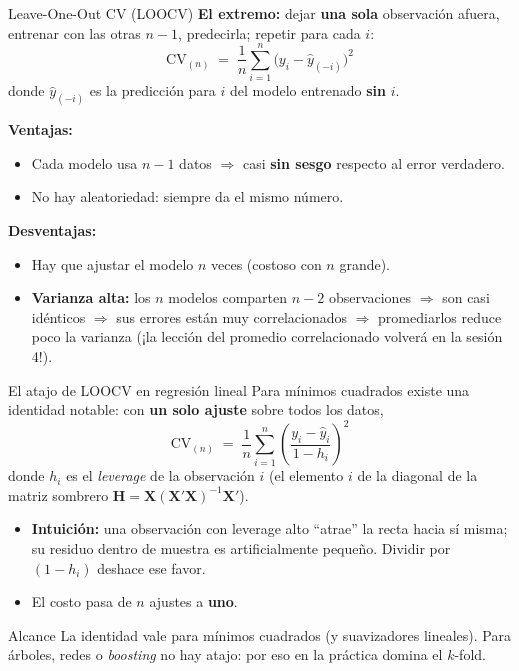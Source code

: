 \documentclass{beamer}
\newcommand{\1}{\mathbb{I}}
\begin{document}
\begin{frame}{Leave-One-Out CV (LOOCV)}
\small
\textbf{El extremo:} dejar \textbf{una sola} observación afuera, entrenar con las otras $n-1$, predecirla; repetir para cada $i$:
\[ \mathrm{CV}_{(n)} \;=\; \frac{1}{n} \sum_{i=1}^{n} \big( y_i - \hat{y}_{(-i)} \big)^2 \]
donde $\hat{y}_{(-i)}$ es la predicción para $i$ del modelo entrenado \textbf{sin} $i$.
\pause

\vspace{0.2cm}
\textbf{Ventajas:}
\begin{itemize}\itemsep3pt
  \item Cada modelo usa $n-1$ datos $\Rightarrow$ casi \textbf{sin sesgo} respecto al error verdadero.
  \item No hay aleatoriedad: siempre da el mismo número.
\end{itemize}
\pause

\textbf{Desventajas:}
\begin{itemize}\itemsep3pt
  \item Hay que ajustar el modelo $n$ veces (costoso con $n$ grande).
  \item \textbf{Varianza alta:} los $n$ modelos comparten $n-2$ observaciones $\Rightarrow$ son casi idénticos $\Rightarrow$ sus errores están muy correlacionados $\Rightarrow$ promediarlos reduce poco la varianza (¡la lección del promedio correlacionado volverá en la sesión 4!).
\end{itemize}
\end{frame}

\begin{frame}{El atajo de LOOCV en regresión lineal}
\small
Para mínimos cuadrados existe una identidad notable: con \textbf{un solo ajuste} sobre todos los datos,
\[ \mathrm{CV}_{(n)} \;=\; \frac{1}{n} \sum_{i=1}^{n} \left( \frac{y_i - \hat{y}_i}{1 - h_i} \right)^2 \]
donde $h_i$ es el \emph{leverage} de la observación $i$ (el elemento $i$ de la diagonal de la matriz sombrero $\mathbf{H} = \mathbf{X}(\mathbf{X}'\mathbf{X})^{-1}\mathbf{X}'$).
\pause

\vspace{0.2cm}
\begin{itemize}\itemsep4pt
  \item \textbf{Intuición:} una observación con leverage alto ``atrae'' la recta hacia sí misma; su residuo dentro de muestra es artificialmente pequeño. Dividir por $(1 - h_i)$ deshace ese favor.
  \item El costo pasa de $n$ ajustes a \textbf{uno}.
\end{itemize}
\pause

\begin{block}{Alcance}
La identidad vale para mínimos cuadrados (y suavizadores lineales). Para árboles, redes o \emph{boosting} no hay atajo: por eso en la práctica domina el $k$-fold.
\end{block}
\end{frame}
\end{document}
